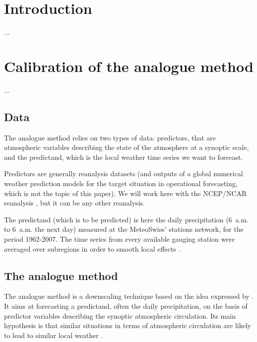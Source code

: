 \documentclass[twocol]{ametsoc}
\begin{document}


\section{Introduction}
...
\cite{Horton2012a}


\section{Calibration of the analogue method}
...

\subsection{Data}

The analogue method relies on two types of data: predictors, that are atmospheric variables describing the state of the atmosphere at a synoptic scale, and the predictand, which is the local weather time series we want to forecast.

Predictors are generally reanalysis datasets (and outputs of a global numerical weather prediction models for the target situation in operational forecasting, which is not the topic of this paper). We will work here with the NCEP/NCAR reanalysis \citep[6-hourly, 17 atmospheric levels at a resolution of 2.5\degree, see][]{Kalnay1996}, but it can be any other reanalysis.

The predictand (which is to be predicted) is here the daily precipitation (6~a.m. to 6~a.m. the next day) measured at the MeteoSwiss' stations network, for the period 1962-2007. The time series from every available gauging station were averaged over subregions in order to smooth local effects \citep{Obled2002, Marty2012}.


\subsection{The analogue method}

The analogue method is a downscaling technique based on the idea expressed by \citet{Lorenz1969}. It aims at forecasting a predictand, often the daily precipitation, on the basis of predictor variables describing the synoptic atmospheric circulation. Its main hypothesis is that similar situations in terms of atmospheric circulation are likely to lead to similar local weather \citep{Bontron2005}.
\end{document}
